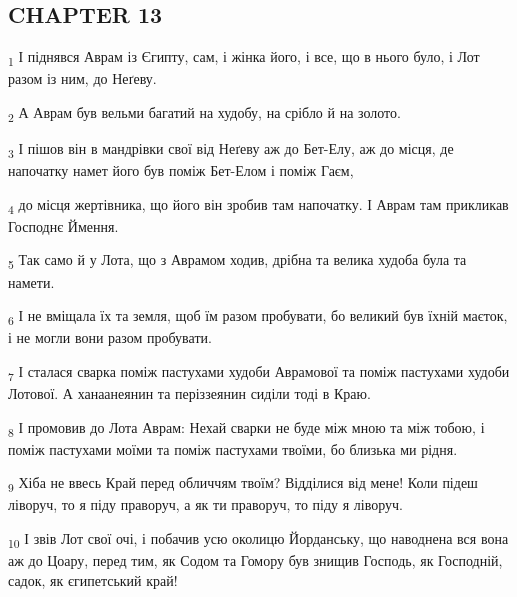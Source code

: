 \subsection{CHAPTER 13}
\begin{tcolorbox}
\textsubscript{1} І піднявся Аврам із Єгипту, сам, і жінка його, і все, що в нього було, і Лот разом із ним, до Неґеву.
\end{tcolorbox}
\begin{tcolorbox}
\textsubscript{2} А Аврам був вельми багатий на худобу, на срібло й на золото.
\end{tcolorbox}
\begin{tcolorbox}
\textsubscript{3} І пішов він в мандрівки свої від Неґеву аж до Бет-Елу, аж до місця, де напочатку намет його був поміж Бет-Елом і поміж Гаєм,
\end{tcolorbox}
\begin{tcolorbox}
\textsubscript{4} до місця жертівника, що його він зробив там напочатку. І Аврам там прикликав Господнє Ймення.
\end{tcolorbox}
\begin{tcolorbox}
\textsubscript{5} Так само й у Лота, що з Аврамом ходив, дрібна та велика худоба була та намети.
\end{tcolorbox}
\begin{tcolorbox}
\textsubscript{6} І не вміщала їх та земля, щоб їм разом пробувати, бо великий був їхній маєток, і не могли вони разом пробувати.
\end{tcolorbox}
\begin{tcolorbox}
\textsubscript{7} І сталася сварка поміж пастухами худоби Аврамової та поміж пастухами худоби Лотової. А ханаанеянин та періззеянин сиділи тоді в Краю.
\end{tcolorbox}
\begin{tcolorbox}
\textsubscript{8} І промовив до Лота Аврам: Нехай сварки не буде між мною та між тобою, і поміж пастухами моїми та поміж пастухами твоїми, бо близька ми рідня.
\end{tcolorbox}
\begin{tcolorbox}
\textsubscript{9} Хіба не ввесь Край перед обличчям твоїм? Відділися від мене! Коли підеш ліворуч, то я піду праворуч, а як ти праворуч, то піду я ліворуч.
\end{tcolorbox}
\begin{tcolorbox}
\textsubscript{10} І звів Лот свої очі, і побачив усю околицю Йорданську, що наводнена вся вона аж до Цоару, перед тим, як Содом та Гомору був знищив Господь, як Господній, садок, як єгипетський край!
\end{tcolorbox}

